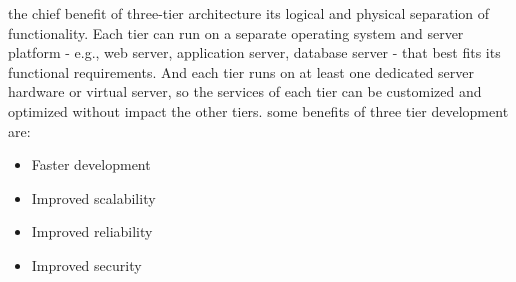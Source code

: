 the chief benefit of three-tier architecture its logical and physical separation of functionality. Each tier can run on a separate operating system and server platform - e.g., web server, application server, database server - that best fits its functional requirements. And each tier runs on at least one dedicated server hardware or virtual server, so the services of each tier can be customized and optimized without impact the other tiers.
some benefits of three tier development are: 
\begin{itemize}
    \item Faster development
    \item Improved scalability
    \item Improved reliability
    \item Improved security
\end{itemize}